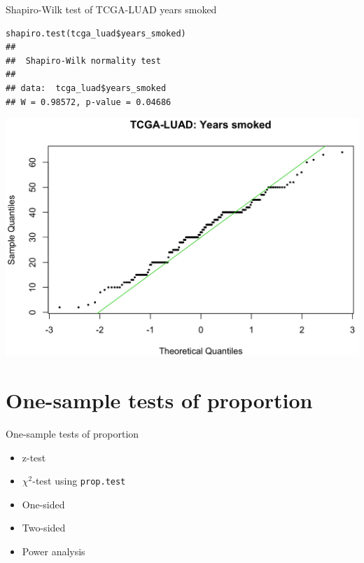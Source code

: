 \documentclass[12pt, t, xcolor=dvipsnames]{beamer}
\newcommand{\code}[1]{\colorbox{codegray}{\textcolor{black!95}{\texttt{#1}}}}
\begin{document}
\begin{frame}[fragile]{Shapiro-Wilk test of TCGA-LUAD years smoked}
\begin{verbatim}
shapiro.test(tcga_luad$years_smoked)
## 
##  Shapiro-Wilk normality test
## 
## data:  tcga_luad$years_smoked
## W = 0.98572, p-value = 0.04686
\end{verbatim}
\includegraphics[height=0.6\textheight, keepaspectratio]{qqys}
\end{frame}



\section{One-sample tests of proportion}

\begin{frame}{One-sample tests of proportion}
\begin{itemize}
  \item z-test
  \item $\chi^2$-test using \code{prop.test}
  \item One-sided
  \item Two-sided
  \item Power analysis
  
\end{itemize}

\end{frame}
\end{document}
